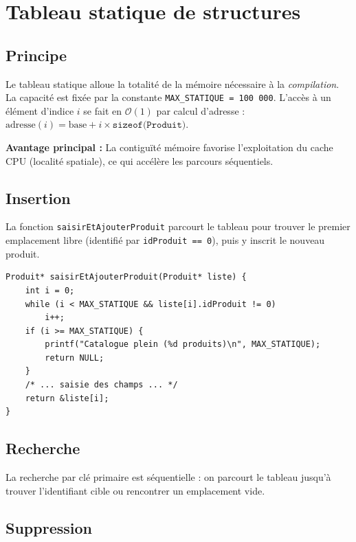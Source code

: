 \documentclass[12pt,a4paper]{report}
\begin{document}
\section{Tableau statique de structures}

\subsection{Principe}

Le tableau statique alloue la totalité de la mémoire nécessaire à la \emph{compilation}. La capacité est fixée par la constante \texttt{MAX\_STATIQUE = 100\,000}. L'accès à un élément d'indice $i$ se fait en $\mathcal{O}(1)$ par calcul d'adresse : $\text{adresse}(i) = \text{base} + i \times \texttt{sizeof(Produit)}$.

\begin{boiteInfo}
\textbf{Avantage principal :} La contiguïté mémoire favorise l'exploitation du cache CPU (localité spatiale), ce qui accélère les parcours séquentiels.
\end{boiteInfo}

\subsection{Insertion}

La fonction \texttt{saisirEtAjouterProduit} parcourt le tableau pour trouver le premier emplacement libre (identifié par \texttt{idProduit == 0}), puis y inscrit le nouveau produit.

\begin{lstlisting}[caption={Insertion dans le tableau statique}, label=lst:insert_stat]
Produit* saisirEtAjouterProduit(Produit* liste) {
    int i = 0;
    while (i < MAX_STATIQUE && liste[i].idProduit != 0)
        i++;
    if (i >= MAX_STATIQUE) {
        printf("Catalogue plein (%d produits)\n", MAX_STATIQUE);
        return NULL;
    }
    /* ... saisie des champs ... */
    return &liste[i];
}
\end{lstlisting}

\subsection{Recherche}

La recherche par clé primaire est séquentielle : on parcourt le tableau jusqu'à trouver l'identifiant cible ou rencontrer un emplacement vide.

\subsection{Suppression}
\end{document}
